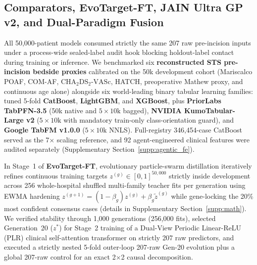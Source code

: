 \subsection{Comparators, EvoTarget-FT, JAIN Ultra GP v2, and Dual-Paradigm Fusion}
All 50,000-patient models consumed strictly the same 207 raw pre-incision inputs under a process-wide sealed-label audit hook blocking holdout-label contact during training or inference. We benchmarked six \textbf{reconstructed STS pre-incision bedside proxies} calibrated on the 50k development cohort (Mariscalco POAF,\cite{mariscalco2014poaf} COM-AF,\cite{burgos2021comaf} $\mathrm{CHA_2DS_2\text{-}VASc}$,\cite{lip2010cha2ds2vasc} HATCH,\cite{devos2010hatch} preoperative Mathew proxy,\cite{mathew2004multicenter} and continuous age alone) alongside six world-leading binary tabular learning families:\cite{grinsztajn2022why,erickson2025tabarena} tuned 5-fold \textbf{CatBoost},\cite{prokhorenkova2018catboost} \textbf{LightGBM},\cite{ke2017lightgbm} and \textbf{XGBoost},\cite{chen2016xgboost} plus \textbf{PriorLabs TabPFN-3.5} (50k native and $5\times 10\text{k}$ bagged),\cite{hollmann2025tabpfn,jaeger2026tabpfn35} \textbf{NVIDIA KumoTabular-Large v2} ($5\times 10\text{k}$ with mandatory train-only class-orientation guard),\cite{qu2026kumotabular} and \textbf{Google TabFM v1.0.0} ($5\times 10\text{k}$ NNLS).\cite{kong2026tabfm} Full-registry 346,454-case CatBoost served as the 7$\times$ scaling reference, and 92 agent-engineered clinical features were audited separately (Supplementary Section~\ref{supp:agentic_fe}).

In Stage~1 of \textbf{EvoTarget-FT}, evolutionary particle-swarm distillation\cite{hinton2015distilling} iteratively refines continuous training targets $z^{(g)} \in [0,1]^{50{,}000}$ strictly inside development across 256 whole-hospital shuffled multi-family teacher fits per generation using EWMA hardening $z^{(g+1)}=(1-\beta_g)z^{(g)}+\beta_g\tilde{z}^{(g)}$ while gene-locking the 20\% most confident consensus cases (details in Supplementary Section~\ref{supp:math}). We verified stability through 1,000 generations (256,000 fits), selected Generation~20 ($z^*$) for Stage~2 training of a Dual-View Periodic Linear-ReLU (PLR) clinical self-attention transformer\cite{gorishniy2021revisiting,gorishniy2022embeddings,izmailov2018swa} on strictly 207 raw predictors, and executed a strictly nested 5-fold outer-loop 207-raw Gen-20 evolution plus a global 207-raw control for an exact 2$\times$2 causal decomposition.

